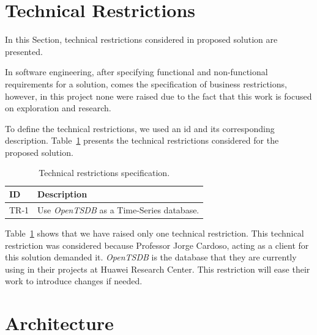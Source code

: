 \section{Technical Restrictions}
\label{sec:technical_restrictions}

In this Section, technical restrictions considered in proposed solution are presented.

In software engineering, after specifying functional and non-functional requirements for a solution, comes the specification of business restrictions, however, in this project none were raised due to the fact that this work is focused on exploration and research.

To define the technical restrictions, we used an id and its corresponding description. Table~\ref{table:technical_restrictions_specification} presents the technical restrictions considered for the proposed solution.

\begin{table}[H]
    \caption{Technical restrictions specification.}
    \label{table:technical_restrictions_specification}
    \centering
    \begin{tabularx}{\linewidth} {
        |>{\hsize=0.25\hsize}X|
        >{\hsize=0.75\hsize}X| }
        \cline{1-2}
        \textbf{ID}
         & \textbf{Description}                    \\ \hline
        TR-1
         & Use \emph{OpenTSDB} as a Time-Series database. \\ \hline
    \end{tabularx}
\end{table}

Table~\ref{table:technical_restrictions_specification} shows that we have raised only one technical restriction. This technical restriction was considered because Professor Jorge Cardoso, acting as a client for this solution demanded it. \emph{OpenTSDB} is the database that they are currently using in their projects at Huawei Research Center. This restriction will ease their work to introduce changes if needed.

\section{Architecture}
\label{sec:architecture}

